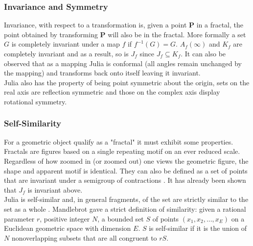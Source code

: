 \documentclass[12pt]{article}
\begin{document}
{\parindent0pt
\subsubsection{Invariance and Symmetry }
Invariance, with respect to a transformation is, given a point $\mathbf{P}$ in a fractal,  the point obtained by transforming $\mathbf{P}$ will also be in the fractal.\cite{hans} More formally a set $G$ is completely invariant under a map $f$ if $f^{-1} (G) = G$. \cite{solomak} $A_f(\infty)$  and $K_f$ are completely invariant and as a result, so is $J_f$ since $J_f \subseteq K_f$.  It can also be observed that as a mapping Julia is conformal (all angles remain unchanged by the mapping) and transforms back onto itself\cite{hans} leaving it invariant. \\

Julia also has the property of being point symmetric about the origin\cite{hans}, sets on the real axis are reflection symmetric and those on the complex axis display rotational symmetry.\cite{hypertext} 

\subsubsection{Self-Similarity}
For a geometric object qualify as a "fractal" it must exhibit some properties. Fractals are figures based on a single repeating motif on an ever reduced scale.\cite{hans} Regardless of how zoomed in (or zoomed out) one views the geometric figure, the shape and apparent motif is identical. They can also be defined as a set of points that are invariant under a semigroup of contractions \cite{hans}. It has already been shown that $J_f$ is invariant above.  \\

Julia is self-similar \cite{Frame} and, in general fragments, of the set are strictly similar to the set as a whole \cite{hypertext}. Mandlebrot gave a strict definition of similarity\cite{goodwin}: given a rational parameter $r$, positive integer $N$, a bounded set $S$ of points  $(x_1,x_2, \hdots, x_E)$ on a Euclidean geometric space with dimension $E$. $S$ is self-similar if it is the union of $N$ nonoverlapping subsets that are all congruent to $rS$.

}
\end{document}
